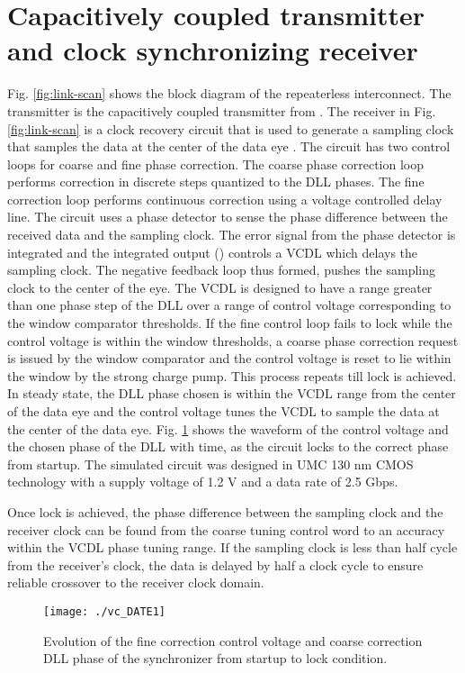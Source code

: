 \documentclass[conference]{IEEEtran}
\begin{document}
\section{Capacitively coupled transmitter and clock synchronizing receiver}
Fig. \ref{fig:link-scan} shows the block diagram of the repeaterless interconnect.
The transmitter is the capacitively coupled transmitter from \cite{naveen_vlsi13}.
The receiver in Fig. \ref{fig:link-scan} is a clock recovery circuit
that is used to generate a sampling clock that samples the data at the
center of the data eye \cite{naveen-arxiv15}. 
The circuit has two control loops for coarse and fine phase 
correction. The coarse phase correction loop performs correction in 
discrete steps quantized to the DLL phases. The fine correction loop performs
continuous correction using a voltage controlled delay line.
The circuit uses a phase detector to sense the
phase difference between the received data and the sampling clock. The error
signal from the phase detector is integrated and the integrated output ()
controls a VCDL which delays the sampling clock.
The negative feedback loop thus formed, pushes the sampling clock to the 
center of the eye. The VCDL is designed to have a range greater than one
phase step of the DLL over a range of control voltage corresponding to
the window comparator thresholds.
If the fine control loop fails to lock while the control voltage
 is within the window thresholds, a coarse phase correction request
is issued by the window comparator and the control voltage is reset to 
lie within the window by the strong charge pump. This process repeats
till lock is achieved. In steady state, the DLL phase chosen is within
the VCDL range from the center of the data eye and the control
voltage tunes the VCDL to sample the data at the center of the data eye.
Fig. \ref{fig:results} shows the waveform of the control voltage and 
the chosen phase of the DLL with time,  
as the circuit locks to the correct phase from startup.
The simulated circuit was designed in UMC 130 nm CMOS technology with 
a supply voltage of 1.2 V and a data rate of 2.5 Gbps.

Once lock is achieved,
the phase difference between the sampling clock and the receiver clock
can be found from the coarse tuning control word to an accuracy within the
VCDL phase tuning range. If the sampling clock is less than half cycle
from the receiver's clock, the data is delayed by half a clock cycle 
to ensure reliable crossover to the receiver clock domain.

\begin{figure}[h]
\centering
{}
\texttt{[image: ./vc\_DATE1]}\label{fig:Vc_alex}
\caption{Evolution of the fine correction control voltage  
and coarse correction DLL phase of the synchronizer from startup to 
lock condition.}
\label{fig:results}
\end{figure}
\end{document}
